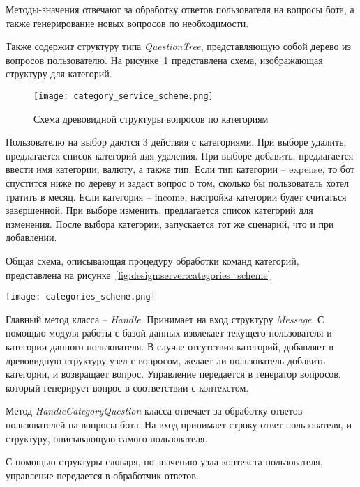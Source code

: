 Методы-значения отвечают за обработку ответов пользователя на вопросы бота, а также генерирование новых вопросов по необходимости.

Также содержит структуру типа \emph{QuestionTree}, представляющую собой дерево из вопросов пользователю. На рисунке~\ref{fig:design:server:category_service_scheme} представлена схема, изображающая структуру для категорий.

\begin{figure}[!h]
\centering
	\texttt{[image: category\_service\_scheme.png]}
	\caption{Схема древовидной структуры вопросов по категориям}
	\label{fig:design:server:category_service_scheme}
\end{figure}

Пользователю на выбор даются 3 действия с категориями. При выборе удалить, предлагается список категорий для удаления. При выборе добавить, предлагается ввести имя категории, валюту, а также тип. Если тип категории – expense, то бот спустится ниже по дереву и задаст вопрос о том, сколько бы пользователь хотел тратить в месяц. Если категория – income, настройка категории будет считаться завершенной. При выборе изменить, предлагается список категорий для изменения. После выбора категории, запускается тот же сценарий, что и при добавлении.

Общая схема, описывающая процедуру обработки команд категорий, представлена на рисунке~\ref{fig:design:server:categories_scheme}

\begin{sidewaysfigure}
\centering
	\texttt{[image: categories\_scheme.png]}
	\caption{Общая схема работы сервиса категорий}
	\label{fig:design:server:categories_scheme}
\end{sidewaysfigure}

Главный метод класса – \emph{Handle}. Принимает на вход структуру \emph{Message}. С помощью модуля работы с базой данных извлекает текущего пользователя и категории данного пользователя. В случае отсутствия категорий, добавляет в древовидную структуру узел с вопросом, желает ли пользователь добавить категории, и возвращает вопрос. Управление передается в генератор вопросов, который генерирует вопрос в соответствии с контекстом.

Метод \emph{HandleCategoryQuestion} класса отвечает за обработку ответов
пользователей на вопросы бота. На вход принимает строку-ответ
пользователя, и структуру, описывающую самого пользователя.

С помощью структуры-словаря, по значению узла контекста
пользователя, управление передается в обработчик ответов.

